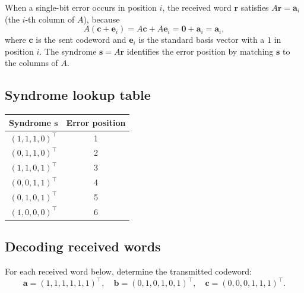 When a single-bit error occurs in position $i$, the received word $\mathbf{r}$
satisfies $A\mathbf{r} = \mathbf{a}_i$ (the $i$-th column of $A$), because
\[
    A(\mathbf{c} + \mathbf{e}_i) = A\mathbf{c} + A\mathbf{e}_i
    = \mathbf{0} + \mathbf{a}_i = \mathbf{a}_i,
\]
where $\mathbf{c}$ is the sent codeword and $\mathbf{e}_i$ is the standard
basis vector with a $1$ in position $i$. The syndrome $\mathbf{s} = A\mathbf{r}$
identifies the error position by matching $\mathbf{s}$ to the columns of $A$.

\subsection{Syndrome lookup table}

\begin{center}
\renewcommand{\arraystretch}{1.2}
\begin{tabular}{cc}
    \hline
    \textbf{Syndrome} $\mathbf{s}$ & \textbf{Error position} \\
    \hline
    $(1,1,1,0)^{\top}$ & 1 \\
    $(0,1,1,0)^{\top}$ & 2 \\
    $(1,1,0,1)^{\top}$ & 3 \\
    $(0,0,1,1)^{\top}$ & 4 \\
    $(0,1,0,1)^{\top}$ & 5 \\
    $(1,0,0,0)^{\top}$ & 6 \\
    \hline
\end{tabular}
\end{center}

\subsection{Decoding received words}

\begin{example}
For each received word below, determine the transmitted codeword:
\[
    \mathbf{a} = (1,1,1,1,1,1)^{\top}, \quad
    \mathbf{b} = (0,1,0,1,0,1)^{\top}, \quad
    \mathbf{c} = (0,0,0,1,1,1)^{\top}.
\]
\end{example}


